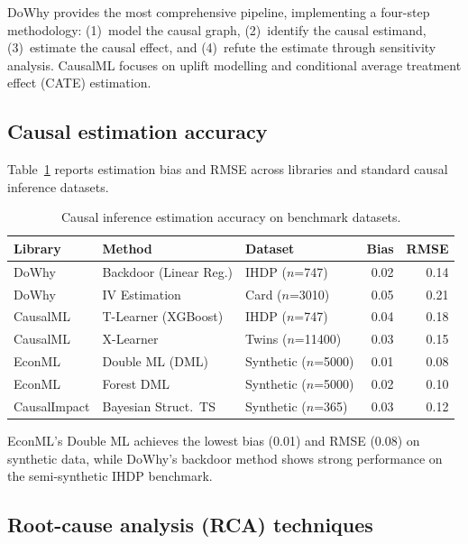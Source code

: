 \documentclass[preprint,12pt,authoryear]{elsarticle}
\theoremstyle{definition}
\begin{document}
DoWhy \citep{sharma2020dowhy} provides the most comprehensive pipeline, implementing a four-step methodology: (1)~model the causal graph, (2)~identify the causal estimand, (3)~estimate the causal effect, and (4)~refute the estimate through sensitivity analysis. CausalML \citep{chen2020causalml} focuses on uplift modelling and conditional average treatment effect (CATE) estimation.

\subsection{Causal estimation accuracy}
Table~\ref{tab:causal-benchmarks} reports estimation bias and RMSE across libraries and standard causal inference datasets.

\begin{table}[ht]
\centering
\caption{Causal inference estimation accuracy on benchmark datasets.}
\label{tab:causal-benchmarks}
\begin{tabular}{lllrr}
\toprule
\textbf{Library} & \textbf{Method} & \textbf{Dataset} & \textbf{Bias} & \textbf{RMSE} \\
\midrule
DoWhy    & Backdoor (Linear Reg.)  & IHDP ($n$=747)       & 0.02 & 0.14 \\
DoWhy    & IV Estimation           & Card ($n$=3010)      & 0.05 & 0.21 \\
CausalML & T-Learner (XGBoost)     & IHDP ($n$=747)       & 0.04 & 0.18 \\
CausalML & X-Learner               & Twins ($n$=11400)    & 0.03 & 0.15 \\
EconML   & Double ML (DML)         & Synthetic ($n$=5000) & 0.01 & 0.08 \\
EconML   & Forest DML              & Synthetic ($n$=5000) & 0.02 & 0.10 \\
CausalImpact & Bayesian Struct.~TS & Synthetic ($n$=365)  & 0.03 & 0.12 \\
\bottomrule
\end{tabular}
\end{table}

EconML's Double ML achieves the lowest bias (0.01) and RMSE (0.08) on synthetic data, while DoWhy's backdoor method shows strong performance on the semi-synthetic IHDP benchmark.

\subsection{Root-cause analysis (RCA) techniques}
\end{document}
